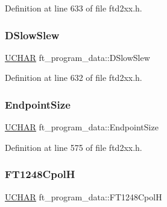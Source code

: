 Definition at line 633 of file ftd2xx.\+h.

\mbox{\label{structft__program__data_adfbbf08781239df8c124f00785c8b7cb}} 
\subsubsection{\texorpdfstring{D\+Slow\+Slew}{DSlowSlew}}
{\footnotesize\ttfamily \hyperlink{CatCaloProto40MHz_2inc_2WinTypes_8h_a4f4bb67531a9bf6f0b9c6ad76aeba587}{U\+C\+H\+AR} ft\+\_\+program\+\_\+data\+::\+D\+Slow\+Slew}



Definition at line 632 of file ftd2xx.\+h.

\mbox{\label{structft__program__data_adef6d265cbf1ca51540468b6f39c387a}} 
\subsubsection{\texorpdfstring{Endpoint\+Size}{EndpointSize}}
{\footnotesize\ttfamily \hyperlink{CatCaloProto40MHz_2inc_2WinTypes_8h_a4f4bb67531a9bf6f0b9c6ad76aeba587}{U\+C\+H\+AR} ft\+\_\+program\+\_\+data\+::\+Endpoint\+Size}



Definition at line 575 of file ftd2xx.\+h.

\mbox{\label{structft__program__data_a60a9e8a5d36a0e3afcb3236f82a99b1d}} 
\subsubsection{\texorpdfstring{F\+T1248\+CpolH}{FT1248CpolH}}
{\footnotesize\ttfamily \hyperlink{CatCaloProto40MHz_2inc_2WinTypes_8h_a4f4bb67531a9bf6f0b9c6ad76aeba587}{U\+C\+H\+AR} ft\+\_\+program\+\_\+data\+::\+F\+T1248\+CpolH}



